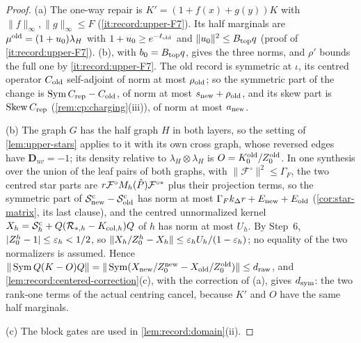 \begin{proof}
(a) The one-way repair is $K'=(1+f(x)+g(y))K$ with $\|f\|_\infty,\|g\|_\infty\le F$
(\ref{it:record:upper-F7}). Its half marginals are $\mu^{\rm old}=(1+u_0)\lambda_H$
with $1+u_0\ge e^{-\ell_{\rm old}}$ and $\|u_0\|^2\le B_{\rm top}q$ (proof of
\ref{it:record:upper-F7}). (b), with
$b_0=B_{\rm top}q$, gives the three norms, and $\rho'$ bounds the full one by
\ref{it:record:upper-F7}. The old record is symmetric at $\iota$, its centred
operator $C_{\rm old}$ self-adjoint of norm at most $\rho_{\rm old}$; so the
symmetric part of the change is $\operatorname{Sym}C_{\rm rep}-C_{\rm old}$, of norm
at most $s_{\rm new}+\rho_{\rm old}$, and its skew part is
$\operatorname{Skew}C_{\rm rep}$ (\cref{rem:cp:charging}(iii)), of norm at most
$a_{\rm new}$.

(b) The graph $G$ has the half graph $H$ in both layers, so the setting of
\cref{lem:upper-stars} applies to it with its own cross graph, whose reversed
edges have $\mathbf D_{uv}=-1$; its density relative to $\lambda_H\otimes\lambda_H$
is $O=K^{\rm old}_0/Z^{\rm old}_0$. In one synthesis over the union of the leaf
pairs of both graphs, with $\|\mathcal F^\circ\|^2\le\Gamma_F$, the two centred
star parts are $r\mathcal F^\circ M_h(\hat P)\mathcal F^{\circ*}$ plus their
projection terms, so the symmetric part of
$\mathcal S^{\rm c}_{\rm new}-\mathcal S^{\rm c}_{\rm old}$ has norm at most
$\Gamma_Fk_\Delta r+E_{\rm new}+E_{\rm old}$ (\cref{cor:star-matrix}, its last
clause), and the centred unnormalized kernel
$X_h=\mathcal S^{\rm c}_h+Q(\mathcal R_{*,h}-K_{{\rm col},h})Q$ of $h$ has norm at
most $U_h$. By Step~6, $|Z^h_0-1|\le\varepsilon_h<1/2$, so
$\|X_h/Z^h_0-X_h\|\le\varepsilon_hU_h/(1-\varepsilon_h)$; no equality of the two normalizers is
assumed. Hence
$\|\operatorname{Sym}Q(K-O)Q\|=\|\operatorname{Sym}(X_{\rm new}/Z^{\rm new}_0-X_{\rm old}/Z^{\rm old}_0)\|\le d_{\rm raw}$,
and \cref{lem:record:centered-correction}(c), with the correction of (a), gives
$d_{\rm sym}$: the two rank-one terms of the actual centring cancel, because
$K'$ and $O$ have the same half marginals.

(c) The block gates are used in \cref{lem:record:domain}(ii).
\end{proof}

